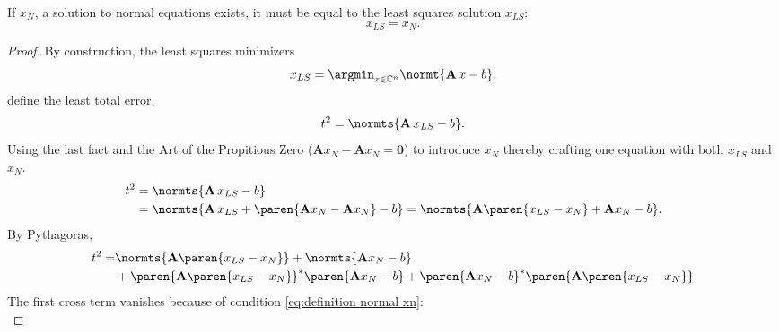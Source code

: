 % 

\begin{thm}

If $x_{N}$, a solution to normal equations exists, it must be equal to the least squares solution $x_{LS}$:
\begin{equation*}
	x_{LS} =  x_{N}.
\end{equation*}
\label{thm:normal equations}
\end{thm}


\begin{proof}

By construction, the least squares minimizers
\begin{equation}
	x_{LS} = \argmin_{x\in\mathbb{C}^{n}} \normt{\mathbf{A}\,x-b},
\label{eq:definition xls}
\end{equation}
define the least total error,
\begin{equation}
	t^{2} = \normts{\mathbf{A}\,x_{LS} - b}.
\end{equation}
Using the last fact and the Art of the Propitious Zero ($\mathbf{A}x_{N} - \mathbf{A}x_{N} = \mathbf{0}$) to introduce $x_{N}$ thereby crafting one equation with both $x_{LS}$ and $x_{N}$.
%
\begin{equation*}
	\begin{split}
		t^{2} 
		&= \normts{\mathbf{A}\,x_{LS} - b} \\
		&= \normts{\mathbf{A}\,x_{LS} + \paren{ \mathbf{A}x_{N} - \mathbf{A}x_{N} } - b} 
		= \normts{\mathbf{A} \paren{ x_{LS} - x_{N} } + \mathbf{A}x_{N} - b}.
	\end{split}
\end{equation*}
%
By Pythagoras,
%
\begin{equation*}
	\begin{split}
	t^{2} = &\normts{ \mathbf{A} \paren{ x_{LS} - x_{N} } } 
		 + \normts{ \mathbf{A}x_{N} - b } \\
		&+ \paren{ \mathbf{A} \paren{ x_{LS} - x_{N} } }^{*} \paren{ \mathbf{A}x_{N} - b }
		 + \paren{ \mathbf{A}x_{N} - b }^{*} \paren{ \mathbf{A} \paren{ x_{LS} - x_{N} } }
	\end{split}
\end{equation*}
The first cross term vanishes because of condition \eqref{eq:definition normal xn}:
%
\begin{equation*}

\end{equation*}
\end{proof}

